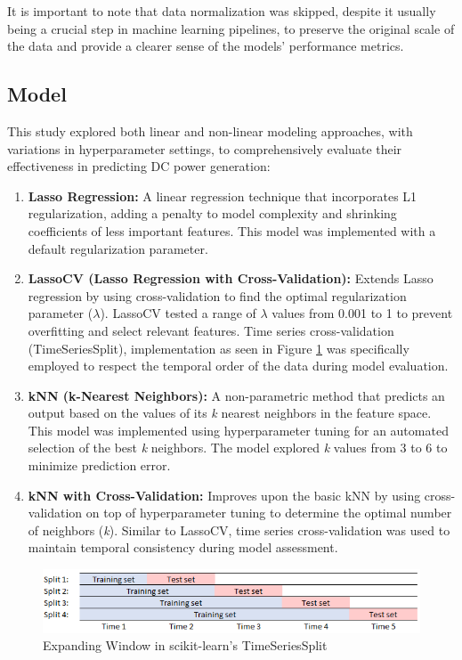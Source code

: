 It is important to note that data normalization was skipped, despite it usually being a crucial step in machine learning pipelines, to preserve the original scale of the data and provide a clearer sense of the models' performance metrics.

\subsection{Model}

This study explored both linear and non-linear modeling approaches, with variations in hyperparameter settings, to comprehensively evaluate their effectiveness in predicting DC power generation:

\begin{enumerate}
   \item \textbf{Lasso Regression:} A linear regression technique that incorporates L1 regularization, adding a penalty to model complexity and shrinking coefficients of less important features. This model was implemented with a default regularization parameter.
   \item \textbf{LassoCV (Lasso Regression with Cross-Validation):} Extends Lasso regression by using cross-validation to find the optimal regularization parameter (\(\lambda\)).  LassoCV tested a range of  \(\lambda\) values from 0.001 to 1 to prevent overfitting and select relevant features. Time series cross-validation (TimeSeriesSplit), implementation as seen in Figure \ref{fig:time_series_split} was specifically employed to respect the temporal order of the data during model evaluation.
   \item \textbf{kNN (k-Nearest Neighbors):} A non-parametric method that predicts an output based on the values of its \emph{k} nearest neighbors in the feature space. This model was implemented using hyperparameter tuning for an automated selection of the best \emph{k} neighbors. The model explored \emph{k} values from 3 to 6 to minimize prediction error. 
   \item \textbf{kNN with Cross-Validation:} Improves upon the basic kNN by using cross-validation on top of hyperparameter tuning to determine the optimal number of neighbors (\emph{k}). Similar to LassoCV, time series cross-validation was used to maintain temporal consistency during model assessment. 
\end{enumerate} 

\begin{figure}[!htpb]
    \centering
    \includegraphics[width=\linewidth]{Figures/time_series_split.png}
    \caption{Expanding Window in scikit-learn's TimeSeriesSplit}
    \label{fig:time_series_split}
\end{figure}

